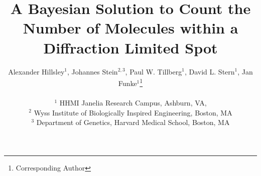 \documentclass[twocolumn]{article}
\begin{document}
\title{A Bayesian Solution to Count the Number of Molecules within a Diffraction Limited Spot}

\author{
  Alexander Hillsley$^{1}$,
  Johannes Stein$^{2,3}$,
  Paul W. Tillberg$^{1}$,
  David L. Stern$^{1}$,
  Jan Funke$^{1}$\thanks{Corresponding Author}
  \\\\
  \normalsize{$^1$ HHMI Janelia Research Campus, Ashburn, VA}, \\
  \normalsize{$^2$ Wyss Institute of Biologically Inspired Engineering, Boston, MA} \\
  \normalsize{$^3$ Department of Genetics, Harvard Medical School, Boston, MA}
  }

\maketitle











{
  \small
  
  
}

\clearpage
% 
\end{document}
